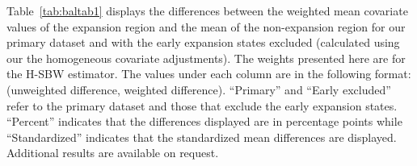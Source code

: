 \begin{landscape}
Table~\ref{tab:baltab1} displays the differences between the weighted mean covariate values of the expansion region and the mean of the non-expansion region for our primary dataset and with the early expansion states excluded (calculated using our the homogeneous covariate adjustments). The weights presented here are for the H-SBW estimator. The values under each column are in the following format: (unweighted difference, weighted difference). ``Primary'' and ``Early excluded'' refer to the primary dataset and those that exclude the early expansion states. ``Percent'' indicates that the differences displayed are in percentage points while ``Standardized'' indicates that the standardized mean differences are displayed. Additional results are available on request.


\end{landscape}
